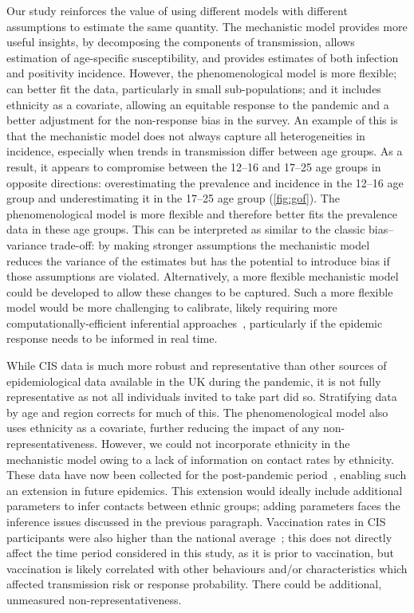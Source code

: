 \documentclass[9pt,twocolumn,twoside]{pnas-new}
\begin{document}
Our study reinforces the value of using different models with different assumptions to estimate the same quantity.
The mechanistic model provides more useful insights, by decomposing the components of transmission, allows estimation  of age-specific susceptibility, and provides estimates of both infection and positivity incidence. 
However, the phenomenological model is more flexible; can better fit the data, particularly in small sub-populations; and it includes ethnicity as a covariate, allowing an equitable response to the pandemic and a better adjustment for the non-response bias in the survey.
An example of this is that the mechanistic model does not always capture all heterogeneities in incidence, especially when trends in transmission differ between age groups.
As a result, it appears to compromise between the 12--16 and 17--25 age groups in opposite directions: overestimating the prevalence and incidence in the 12--16 age group and underestimating it in the 17--25 age group (\cref{fig:gof}).
The phenomenological model is more flexible and therefore better fits the prevalence data in these age groups.
This can be interpreted as similar to the classic bias--variance trade-off: by making stronger assumptions the mechanistic model reduces the variance of the estimates but has the potential to introduce bias if those assumptions are violated.
Alternatively, a more flexible mechanistic model could be developed to allow these changes to be captured.
Such a more flexible model would be more challenging to calibrate, likely  requiring  more computationally-efficient inferential approaches~\citep{strumbeljPresent}, particularly if the epidemic response needs to be informed in real time.

While CIS data is much more robust and representative than other sources of epidemiological data available in the UK during the pandemic, it is not fully representative as not all individuals invited to take part did so.
Stratifying data by age and region corrects for much of this.
The phenomenological model also uses ethnicity as a covariate, further reducing the impact of any non-representativeness.
However, we could not incorporate ethnicity in the mechanistic model owing to a lack of information on contact rates by ethnicity.
These data have now been collected for the post-pandemic period~\citep{goodfellowReconnect}, enabling such an extension in future epidemics.
This extension would ideally include additional parameters to infer contacts between ethnic groups; adding parameters faces the inference issues discussed in the previous paragraph.
Vaccination rates in CIS participants were also higher than the national average~\citep{pouwelsMRPvaccination}; this does not directly affect the time period considered in this study, as it is prior to vaccination, but vaccination is likely correlated with other behaviours and/or characteristics which affected transmission risk or response probability.
There could be additional, unmeasured non-representativeness.
\end{document}
